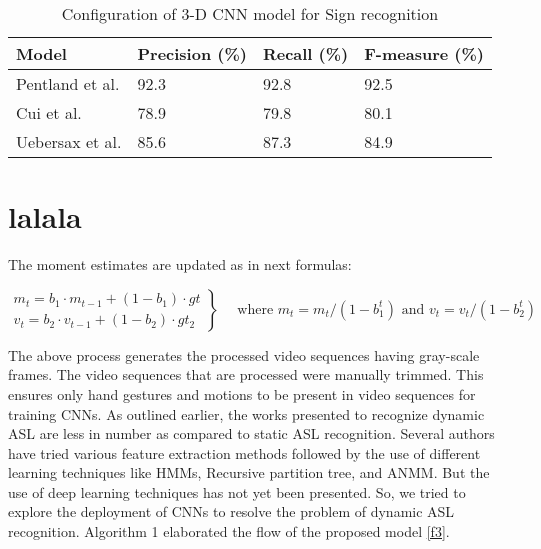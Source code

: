 \documentclass[
  manuscript=article,  %
  layout=preprint,  %
  year=20xx,
  volume=x,
]{joas}
\begin{document}
\begin{table}[!ht]
\caption{ Configuration of 3-D CNN model for Sign recognition\label{tab2}}
\begin{tabular*}{\columnwidth}{@{\extracolsep\fill}|p{3cm}|p{3cm}|p{3cm}|p{3cm}|@{\extracolsep\fill}}
\toprule
Model & Precision (\%) & Recall (\%) & F-measure (\%)\\
\midrule
Pentland et al. & 92.3 & 92.8 & 92.5\\
Cui et al. & 78.9 & 79.8 & 80.1 \\
Uebersax et al. & 85.6 &87.3 & 84.9 \\
\bottomrule
\end{tabular*}
\end{table}






\section{lalala}\label{sec6}

The moment estimates are updated as in next formulas:

\begin{equation*}
    \left.\begin{aligned}
    m_{t}=b_{1} \cdot m_{t-1}+(1-b_{1}) \cdot gt \\
    v_{t}=b_{2} \cdot v_{t-1}+(1-b_{2}) \cdot gt_{2}
    \end{aligned} \right\}
    \quad \text{ where $m_{t} = m_{t}/ \left(1-b^t_{1}\right) $ and
    $v_{t} = v_{t}/ \left(1-b^t_{2}\right)$}
\end{equation*}



The above process generates the processed video sequences having gray-scale frames. The video sequences that are processed were manually trimmed. This ensures only hand gestures and motions to be present in video sequences for training CNNs. As outlined earlier, the works presented to recognize dynamic ASL are less in number as compared to static ASL recognition. Several authors have tried various feature extraction methods followed by the use of different learning techniques like HMMs, Recursive partition tree, and ANMM. But the use of deep learning techniques has not yet been presented. So, we tried to explore the deployment of CNNs to resolve the problem of dynamic ASL recognition. Algorithm 1 elaborated the flow of the proposed model \ref{f3}.
\end{document}
